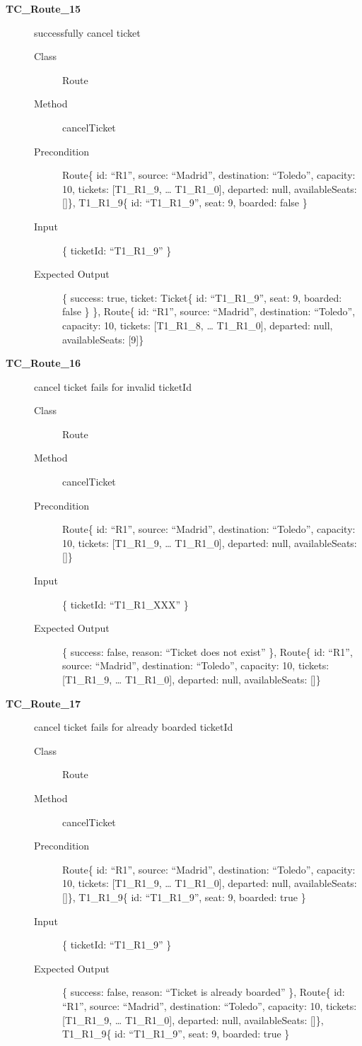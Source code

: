 \documentclass[11pt]{article}
\begin{document}
\begin{description}
\item[{\textbf{TC\_Route\_15}}] successfully cancel ticket
\begin{description}
\item[{Class}] Route
\item[{Method}] cancelTicket
\item[{Precondition}] Route\{ id: “R1”, source: “Madrid”, destination: “Toledo”, capacity: 10,  tickets: [T1\_R1\_9, … T1\_R1\_0], departed: null, availableSeats: []\}, T1\_R1\_9\{ id: “T1\_R1\_9”, seat: 9, boarded: false \}
\item[{Input}] \{ ticketId: “T1\_R1\_9” \}
\item[{Expected Output}] \{ success: true, ticket:  Ticket\{ id: “T1\_R1\_9”, seat: 9, boarded: false \} \},
Route\{ id: “R1”, source: “Madrid”, destination: “Toledo”, capacity: 10,  tickets: [T1\_R1\_8, … T1\_R1\_0], departed: null, availableSeats: [9]\}
\end{description}

\item[{\textbf{TC\_Route\_16}}] cancel ticket fails for invalid ticketId
\begin{description}
\item[{Class}] Route
\item[{Method}] cancelTicket
\item[{Precondition}] Route\{ id: “R1”, source: “Madrid”, destination: “Toledo”, capacity: 10,  tickets: [T1\_R1\_9, … T1\_R1\_0], departed: null, availableSeats: []\}
\item[{Input}] \{ ticketId: “T1\_R1\_XXX” \}
\item[{Expected Output}] \{ success: false, reason: “Ticket does not exist” \},
Route\{ id: “R1”, source: “Madrid”, destination: “Toledo”, capacity: 10,  tickets: [T1\_R1\_9, … T1\_R1\_0], departed: null, availableSeats: []\}
\end{description}

\item[{\textbf{TC\_Route\_17}}] cancel ticket fails for already boarded ticketId
\begin{description}
\item[{Class}] Route
\item[{Method}] cancelTicket
\item[{Precondition}] Route\{ id: “R1”, source: “Madrid”, destination: “Toledo”, capacity: 10,  tickets: [T1\_R1\_9, … T1\_R1\_0], departed: null, availableSeats: []\}, T1\_R1\_9\{ id: “T1\_R1\_9”, seat: 9, boarded: true \}
\item[{Input}] \{ ticketId: “T1\_R1\_9” \}
\item[{Expected Output}] \{ success: false, reason: “Ticket is already boarded” \},
Route\{ id: “R1”, source: “Madrid”, destination: “Toledo”, capacity: 10,  tickets: [T1\_R1\_9, … T1\_R1\_0], departed: null, availableSeats: []\}, T1\_R1\_9\{ id: “T1\_R1\_9”, seat: 9, boarded: true \}
\end{description}


\end{description}
\end{document}
